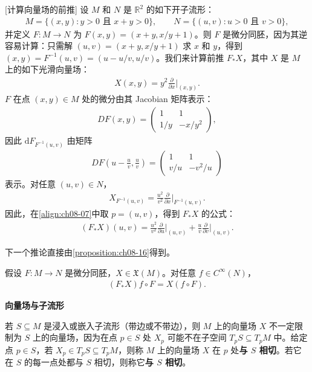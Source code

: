 \documentclass[../../main.tex]{subfiles}
\begin{document}
\begin{example}\label{example:ch08-20}[计算向量场的前推]
设 $M$ 和 $N$ 是 $\mathbb{R}^2$ 的如下开子流形：
\begin{align*}
M=\{(x,y):y>0\text{ 且 }x+y>0\},\qquad
N=\{(u,v):u>0\text{ 且 }v>0\},
\end{align*}
并定义 $F\colon M\to N$ 为 $F(x,y)=(x+y,x/y+1)$。则 $F$ 是微分同胚，因为其逆容易计算：只需解 $(u,v)=(x+y,x/y+1)$ 求 $x$ 和 $y$，得到 $(x,y)=F^{-1}(u,v)=(u-u/v,u/v)$。我们来计算前推 $F_*X$，其中 $X$ 是 $M$ 上的如下光滑向量场：
\begin{align*}
X(x,y)=y^2\frac{\partial}{\partial x}\bigg|_{(x,y)}.
\end{align*}
$F$ 在点 $(x,y)\in M$ 处的微分由其 Jacobian 矩阵表示：
\begin{align*}
DF(x,y)=\begin{pmatrix}1&1\\ 1/y&-x/y^2\end{pmatrix},
\end{align*}
因此 $\mathrm{d}F_{F^{-1}(u,v)}$ 由矩阵
\begin{align*}
DF\left(u-\frac{u}{v},\frac{u}{v}\right)=\begin{pmatrix}1&1\\ v/u&-v^2/u\end{pmatrix}
\end{align*}
表示。对任意 $(u,v)\in N$，
\begin{align*}
X_{F^{-1}(u,v)}=\frac{u^2}{v^2}\frac{\partial}{\partial x}\bigg|_{F^{-1}(u,v)}.
\end{align*}
因此，在\eqref{align:ch08-07}中取 $p=(u,v)$，得到 $F_*X$ 的公式：
\begin{align*}
(F_*X)(u,v)=\frac{u^2}{v^2}\frac{\partial}{\partial u}\bigg|_{(u,v)}+\frac{u}{v}\frac{\partial}{\partial v}\bigg|_{(u,v)}.
\end{align*}
\end{example}

下一个推论直接由\cref{proposition:ch08-16}得到。

\begin{corollary}\label{corollary:ch08-21}
假设 $F\colon M\to N$ 是微分同胚，$X\in\mathfrak{X}(M)$。对任意 $f\in C^\infty(N)$，
\begin{align*}
(F_*X)f\circ F=X(f\circ F).
\end{align*}
\end{corollary}

\textbf{向量场与子流形}

若 $S\subseteq M$ 是浸入或嵌入子流形（带边或不带边），则 $M$ 上的向量场 $X$ 不一定限制为 $S$ 上的向量场，因为在点 $p\in S$ 处 $X_p$ 可能不在子空间 $T_pS\subseteq T_pM$ 中。给定点 $p\in S$，若 $X_p\in T_pS\subseteq T_pM$，则称 $M$ 上的向量场 $X$ 在 $p$ 处\textbf{与 $S$ 相切}。若它在 $S$ 的每一点处都与 $S$ 相切，则称它\textbf{与 $S$ 相切}。
\end{document}

